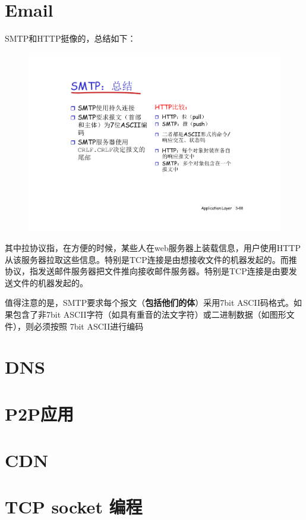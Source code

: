 \documentclass[]{report}
\begin{document}
	\section{Email}
		SMTP和HTTP挺像的，总结如下：\par
		\begin{figure}[h!]
			\centering
			\begin{minipage}{40em}
				\centering
				\includegraphics[scale = 0.5]{images/SMTP_and_HTTP.pdf}
			\end{minipage}
		\end{figure}\par
		其中拉协议指，在方便的时候，某些人在web服务器上装载信息，用户使用HTTP从该服务器拉取这些信息。特别是TCP连接是由想接收文件的机器发起的。而推协议，指发送邮件服务器把文件推向接收邮件服务器。特别是TCP连接是由要发送文件的机器发起的。\par
		值得注意的是，SMTP要求每个报文（\textbf{包括他们的体}）采用7bit ASCII码格式。如果包含了非7bit ASCII字符（如具有重音的法文字符）或二进制数据（如图形文件），则必须按照 7bit ASCII进行编码
	\section{DNS}
	\section{P2P应用}
	\section{CDN}
	\section{TCP socket 编程}
\end{document}
